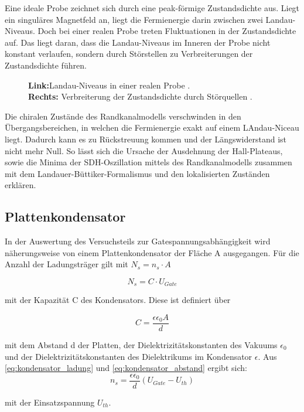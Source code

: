 Eine ideale Probe zeichnet sich durch eine peak-förmige Zustandsdichte aus. Liegt ein singuläres Magnetfeld an, liegt die Fermienergie darin zwischen zwei Landau-Niveaus. Doch bei einer realen Probe treten Fluktuationen in der Zustandsdichte auf. Das liegt daran, dass die Landau-Niveaus im Inneren der Probe nicht konstant verlaufen, sondern durch Störstellen zu Verbreiterungen der Zustandsdichte führen.

\begin{figure}[h]
\centering
{}
\caption[Struktur von Landau-Niveaus in realer Probe]{
	\textbf{Link:}Landau-Niveaus in einer realen Probe \cite{anleitung}.\\
	\textbf{Rechts:} Verbreiterung der Zustandsdichte durch Störquellen \cite{anleitung}.}
\label{fig:fermi_landau_Anleitungsheft}
\end{figure}

Die chiralen Zustände des Randkanalmodells verschwinden in den Übergangsbereichen, in welchen die Fermienergie exakt auf einem LAndau-Niceau liegt. Dadurch kann es zu Rückstreuung kommen und der Längswiderstand ist nicht mehr Null.  
So lässt sich die Ursache der Ausdehnung der Hall-Plateaus, sowie die Minima der SDH-Oszillation mittels des Randkanalmodells zusammen mit dem Landauer-Büttiker-Formalismus und den lokalisierten Zuständen erklären.


\subsection{Plattenkondensator}

In der Auswertung des Versuchsteils zur Gatespannungsabhängigkeit wird näherungsweise von einem Plattenkondensator der Fläche A ausgegangen. Für die Anzahl der Ladungsträger gilt mit $N_s=n_s \cdot A$ 

\begin{equation}
N_s=C \cdot U_{Gate}
\label{eq:kondensator_ladung}
\end{equation}

mit der Kapazität C des Kondensators. Diese ist definiert über

\begin{equation}
C=\frac{\epsilon \epsilon_0 A}{d}
\label{eq:kondensator_abstand}
\end{equation}

mit dem Abstand d der Platten, der Dielektrizitätskonstanten des Vakuums $\epsilon_0$ und der Dielektrizitätskonstanten des Dielektrikums im Kondensator $\epsilon$. 
Aus \ref{eq:kondensator_ladung} und \ref{eq:kondensator_abstand} ergibt sich:
\begin{equation}
n_s=\frac{\epsilon \epsilon_0}{d}(U_{Gate}-U_{th})
\label{eq:kondens_lad_und_abst}
\end{equation}

mit der Einsatzspannung $U_{th}$.
